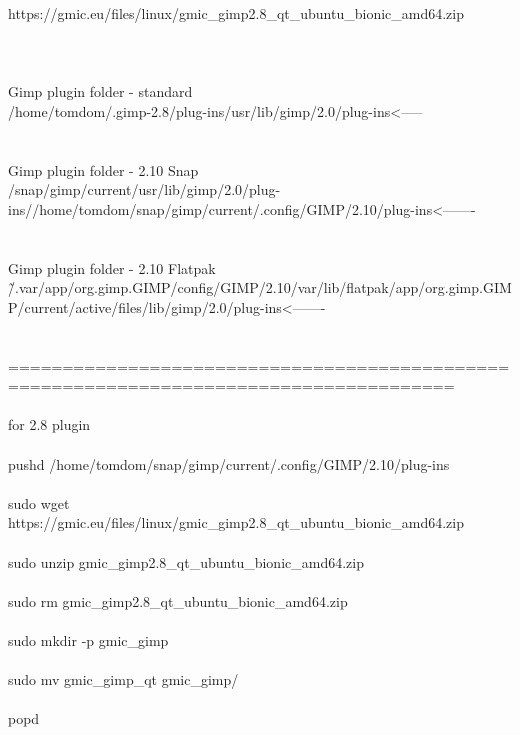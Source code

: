 \documentclass[10pt,a4paper]{article}
\begin{document}
{{{{{{{{{{{{{{{{https://gmic.eu/files/linux/gmic\_gimp2.8\_qt\_ubuntu\_bionic\_amd64.zip}{\large \\
\\
\\
\\
Gimp plugin folder - standard\\
/home/tomdom/.gimp-2.8/plug-ins}{\large /usr/lib/gimp/2.0/plug-ins}{\large      <-----\\
\\
\\
Gimp plugin folder - 2.10 Snap\\
/snap/gimp/current/usr/lib/gimp/2.0/plug-ins/}{\large /home/tomdom/snap/gimp/current/.config/GIMP/2.10/plug-ins}{\large     <-------\\
\\
\\
Gimp plugin folder - 2.10 Flatpak\\
\~/.var/app/org.gimp.GIMP/config/GIMP/2.10}{\large /var/lib/flatpak/app/org.gimp.GIMP/current/active/files/lib/gimp/2.0/plug-ins}{\large      <-------\\
\\
\\
=======================================================================================\\
\\
for 2.8 plugin\\
\\
pushd /home/tomdom/snap/gimp/current/.config/GIMP/2.10/plug-ins}{\large  \\
\\
sudo wget https://gmic.eu/files/linux/gmic\_gimp2.8\_qt\_ubuntu\_bionic\_amd64.zip}{\large \\
\\
sudo unzip gmic\_gimp2.8\_qt\_ubuntu\_bionic\_amd64.zip \\
\\
sudo rm gmic\_gimp2.8\_qt\_ubuntu\_bionic\_amd64.zip \\
\\
sudo mkdir -p gmic\_gimp\\
\\
sudo mv gmic\_gimp\_qt gmic\_gimp/\\
\\
popd\\
\\
\\
\\
\\
\\
}}}}}}}}}}}}}}}}
\end{document}

